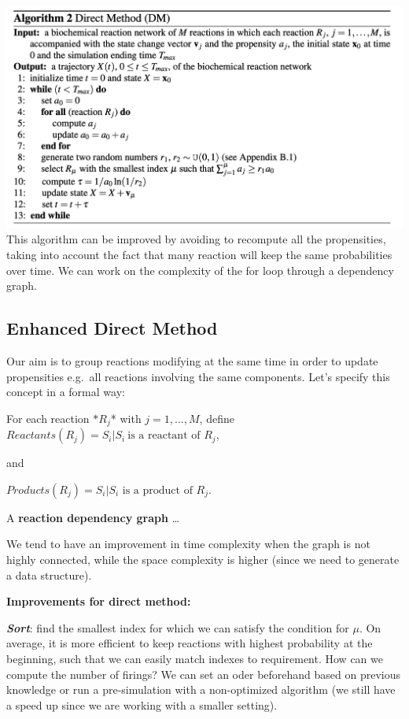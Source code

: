 \includegraphics{03_images/direct_method.png} This algorithm can be
improved by avoiding to recompute all the propensities, taking into
account the fact that many reaction will keep the same probabilities
over time. We can work on the complexity of the for loop through a
dependency graph.

\hypertarget{enhanced-direct-method}{%
\subsection{Enhanced Direct Method}\label{enhanced-direct-method}}

Our aim is to group reactions modifying at the same time in order to
update propensities e.g.~all reactions involving the same components.
Let's specify this concept in a formal way:

For each reaction $*R_j$* with $j = 1,...,M$, define
$Reactants(R_j)={S_i|S_i \ \text{is a reactant of } R_j}$,

and

$Products(R_j) = {S_i|S_i \text{ is a product of } R_j}.$

A \textbf{reaction dependency graph} \ldots{}

We tend to have an improvement in time complexity when the graph is not
highly connected, while the space complexity is higher (since we need to
generate a data structure).

\textbf{Improvements for direct method:}

\textbf{\emph{Sort}}: find the smallest index for which we can satisfy
the condition for $\mu$. On average, it is more efficient to keep
reactions with highest probability at the beginning, such that we can
easily match indexes to requirement. How can we compute the number of
firings? We can set an oder beforehand based on previous knowledge or
run a pre-simulation with a non-optimized algorithm (we still have a
speed up since we are working with a smaller setting).


